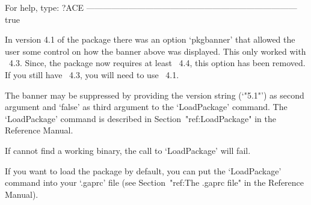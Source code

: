                  For help, type: ?ACE
---------------------------------------------------------------------------
true
\endexample

In version 4.1 of the {\ACE} package there was an  option  `pkgbanner'
that allowed the user  some  control  on  how  the  banner  above  was
displayed. This only worked with {\GAP}~4.3. Since, the {\ACE} package
now requires at least {\GAP}~4.4, this option has been removed. If you
still have {\GAP}~4.3, you will need to use {\ACE}~4.1.

The banner may be suppressed by providing the version string (`"5.1"')
as second argument and `false' as third argument to the  `LoadPackage'
command.    The    `LoadPackage'    command    is     described     in
Section~"ref:LoadPackage" in the {\GAP} Reference Manual.

If {\GAP} cannot find a working binary, the call to `LoadPackage' will
fail.

If you want to load the {\ACE} package by default,  you  can  put  the
`LoadPackage' command into your `.gaprc'  file  (see  Section~"ref:The
.gaprc file" in the {\GAP} Reference Manual).

